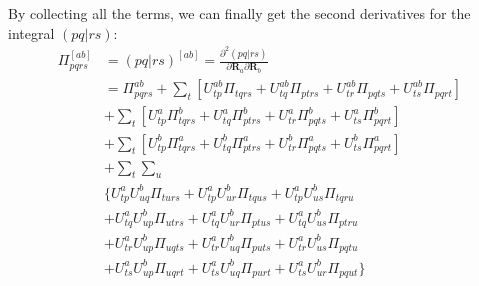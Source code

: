By collecting all the terms, we can finally get the second derivatives for the
integral $(pq|rs)$:
\begin{equation}
 \begin{split}
  \Pi_{pqrs}^{[ab]} &=(pq|rs)^{[ab]} = \frac{\partial^{2} (pq|rs)}{\partial
\bm{R}_{a}\partial\bm{R}_{b}} \\
&= \Pi^{ab}_{pqrs} + 
\sum_{t} \left[ 
U^{ab}_{tp}\Pi_{tqrs} + 
U^{ab}_{tq}\Pi_{ptrs} +
U^{ab}_{tr}\Pi_{pqts} +
U^{ab}_{ts}\Pi_{pqrt}                      
\right] \\
&+ 
\sum_{t} \left[ 
U^{a}_{tp}\Pi^{b}_{tqrs}  +
U^{a}_{tq}\Pi^{b}_{ptrs}  +
U^{a}_{tr}\Pi^{b}_{pqts}  +
U^{a}_{ts}\Pi^{b}_{pqrt}
\right]  \\
&+
\sum_{t}\left[ 
U^{b}_{tp}\Pi^{a}_{tqrs} +
U^{b}_{tq}\Pi^{a}_{ptrs} + 
U^{b}_{tr}\Pi^{a}_{pqts} + 
U^{b}_{ts}\Pi^{a}_{pqrt}  
\right]  \\
&+
\sum_{t}\sum_{u} \\
&\Big\{U^{a}_{tp}U^{b}_{uq}\Pi_{turs} + 
U^{a}_{tp}U^{b}_{ur}\Pi_{tqus} + 
U^{a}_{tp}U^{b}_{us}\Pi_{tqru}  \\
&+ 
U^{a}_{tq}U^{b}_{up}\Pi_{utrs} + 
U^{a}_{tq}U^{b}_{ur}\Pi_{ptus} + 
U^{a}_{tq}U^{b}_{us}\Pi_{ptru}   \\
&+
U^{a}_{tr}U^{b}_{up}\Pi_{uqts} + 
U^{a}_{tr}U^{b}_{uq}\Pi_{puts} + 
U^{a}_{tr}U^{b}_{us}\Pi_{pqtu}    \\
&+
U^{a}_{ts}U^{b}_{up}\Pi_{uqrt} + 
U^{a}_{ts}U^{b}_{uq}\Pi_{purt} + 
U^{a}_{ts}U^{b}_{ur}\Pi_{pqut}  \Big\} 
 \end{split}
 \label{two_electron_MO_INT_gradient_eq:10}
\end{equation}


